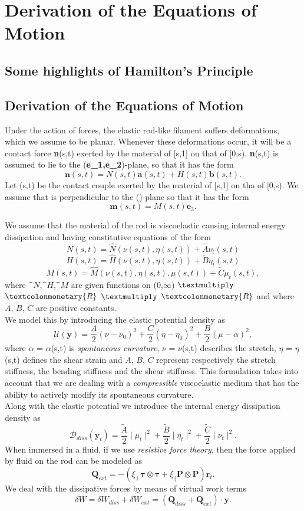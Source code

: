 \documentclass[12pt]{article}
\newcommand{\cB}{B}
\newcommand{\cA}{A}
\newcommand{\cC}{C}
\begin{document}
\section{Derivation of the Equations of Motion
}\label{Derivation of the Equations of Motion
}
\subsection{Some highlights of Hamilton's Principle}
\subsection{Derivation of the Equations of Motion}
Under the action of forces, the elastic rod-like filament suffers deformations, which we assume to be planar. Whenever these deformations occur, it will be a contact force \textbf{n}(s,t) exerted by the material of [s,1] on that of [0,s). \textbf{n}(s,t) is assumed to lie to the (\textbf{e_1,e_2})-plane, so that it has the form
\[  \mathbf{n}(s,t)= N(s,t) \mathbf{a}(s,t) + H(s,t)\mathbf{b} (s,t).
\]
Let (s,t) be the contact couple exerted by the material of [s,1] on tha of [0,s). We assume that  is perpendicular to the ()-plane so that it has the form
\[ 
\mathbf{m}(s,t) = M(s,t)\mathbf{e}_3.
\]

We assume that the material of the rod is viscoelastic causing internal energy dissipation and having constitutive equations of the form
\[  N (s,t)=  \hat{N}(\nu (s,t),\eta (s,t)) + \tilde{A} \nu_t (s,t)
\]
\[  H (s,t)=  \hat{H}(\nu (s,t),\eta (s,t)) + \tilde{B} \eta_t (s,t)
\]
\[  M (s,t)=  \hat{M}(\nu (s,t),\eta (s,t), \mu(s,t)) + \tilde{C} \mu_t (s,t),
\]
where $\^{N}$,$\^{H}$,$\^{M}$ are given functions on (0,$\infty$) $\textmultiply$ $\textcolonmonetary{R}$ $\textmultiply$ $\textcolonmonetary{R}$ and where $\tilde{A}$, $\tilde{B}$, $\tilde{C}$ are positive constants.
\\
We model this by introducing the elastic potential density  as
\[ \mathcal{U}(\mathbf{y}) = \frac{\cA}{2} (\nu - \nu_0)^2
+ \frac{\cC}{2} (\eta - \eta_0 )^2
+ \frac{\cB}{2} (\mu -\alpha)^2,
\]
where $\alpha$ = $\alpha$(s,t) is \emph{spontaneous curvature}, $\nu$ = $\nu$(s,t) describes the stretch, $\eta$ = $\eta$(s,t) defines the shear strain and $\cA$, $\cB$, $\cC$ represent respectively the stretch stiffness, the bending stiffness and the shear stiffness. 
This formulation takes into account that we are dealing with a \emph{compressible} viscoelastic medium that has the ability to actively modify its spontaneous curvature.
\\
Along with the elastic potential we introduce the internal energy dissipation density as 
\[ \mathcal{D}_{diss}(\mathbf{y}_t) = \frac{\tilde{A}}{2}\mid\mu_t\mid^2 + \frac{\tilde{B}}{2}\mid\eta_t\mid^2
+ \frac{\tilde{C}}{2}\mid\nu_t\mid^2.
\]
When immersed in a fluid, if we use \emph{resistive force theory},
then the force applied by fluid on the rod can be modeled as
\[\mathbf{Q}_{ext} = -( \xi_\perp \mathbf{\tau}\otimes\mathbf{\tau} + \xi_\parallel \mathbf{P}\otimes \mathbf{P}) \mathbf{r}_t.\]
We deal with the dissipative forces by means of virtual work terms
\[\delta W = \delta W_{diss} + \delta W_{ext} = (\mathbf{Q}_{diss}+\mathbf{Q}_{ext})\cdot\mathbf{y}.\]
\end{document}
